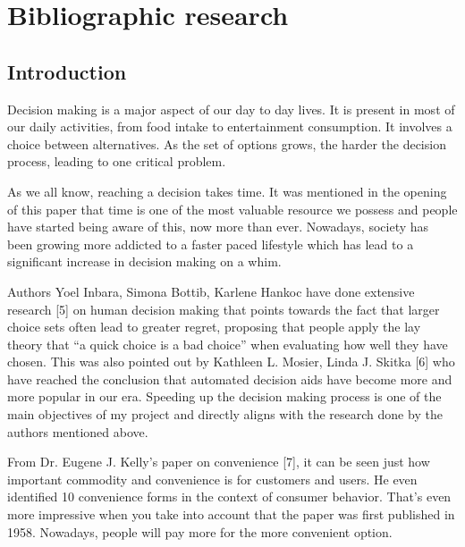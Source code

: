 \documentclass[12pt,a4paper,twoside]{report}
\begin{document}

\chapter{Bibliographic research}


\section{Introduction}

Decision making is a major aspect of our day to day lives. It is present in most of our daily activities, from food intake to entertainment consumption. It involves a choice between alternatives. As the set of options grows, the harder the decision process, leading to one critical problem. 

As we all know, reaching a decision takes time. It was mentioned in the opening of this paper that time is one of the most valuable resource we possess and people have started being aware of this, now more than ever. Nowadays, society has been growing more addicted to a faster paced lifestyle which has lead to a significant increase in decision making on a whim. 

Authors Yoel Inbara, Simona Bottib, Karlene Hankoc have done extensive research [5] on human decision making that points towards the fact that larger choice sets often lead to greater regret, proposing that people apply the lay theory that “a quick choice is a bad choice” when evaluating how well they have chosen. This was also pointed out by Kathleen L. Mosier, Linda J. Skitka [6] who have reached the conclusion that automated decision aids have become more and more popular in our era. Speeding up the decision making process is one of the main objectives of my project and directly aligns with the research done by the authors mentioned above.

From Dr. Eugene J. Kelly's paper on convenience [7], it can be seen just how important commodity and convenience is for customers and users. He even identified 10 convenience forms in the context of consumer behavior. That's even more impressive when you take into account that the paper was first published in 1958. Nowadays, people will pay more for the more convenient option.
\end{document}
